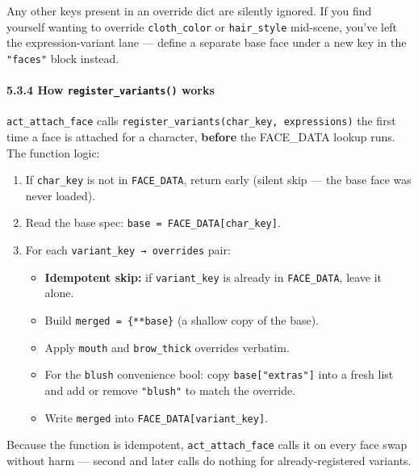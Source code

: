 \documentclass[
  12pt,
  letterpaper,
]{book}
\providecommand{\tightlist}{%
  \setlength{\itemsep}{0pt}\setlength{\parskip}{0pt}}
\begin{document}
Any other keys present in an override dict are silently ignored. If you
find yourself wanting to override \texttt{cloth\_color} or
\texttt{hair\_style} mid-scene, you've left the expression-variant lane
--- define a separate base face under a new key in the \texttt{"faces"}
block instead.

\paragraph{\texorpdfstring{5.3.4 How \texttt{register\_variants()}
works}{5.3.4 How register\_variants() works}}\label{how-register_variants-works}

\texttt{act\_attach\_face} calls
\texttt{register\_variants(char\_key,\ expressions)} the first time a
face is attached for a character, \textbf{before} the FACE\_DATA lookup
runs. The function logic:

\begin{enumerate}
\def\labelenumi{\arabic{enumi}.}
\tightlist
\item
  If \texttt{char\_key} is not in \texttt{FACE\_DATA}, return early
  (silent skip --- the base face was never loaded).
\item
  Read the base spec: \texttt{base\ =\ FACE\_DATA{[}char\_key{]}}.
\item
  For each \texttt{variant\_key\ →\ overrides} pair:

  \begin{itemize}
  \tightlist
  \item
    \textbf{Idempotent skip:} if \texttt{variant\_key} is already in
    \texttt{FACE\_DATA}, leave it alone.
  \item
    Build \texttt{merged\ =\ \{**base\}} (a shallow copy of the base).
  \item
    Apply \texttt{mouth} and \texttt{brow\_thick} overrides verbatim.
  \item
    For the \texttt{blush} convenience bool: copy
    \texttt{base{[}"extras"{]}} into a fresh list and add or remove
    \texttt{"blush"} to match the override.
  \item
    Write \texttt{merged} into \texttt{FACE\_DATA{[}variant\_key{]}}.
  \end{itemize}
\end{enumerate}

Because the function is idempotent, \texttt{act\_attach\_face} calls it
on every face swap without harm --- second and later calls do nothing
for already-registered variants.
\end{document}
